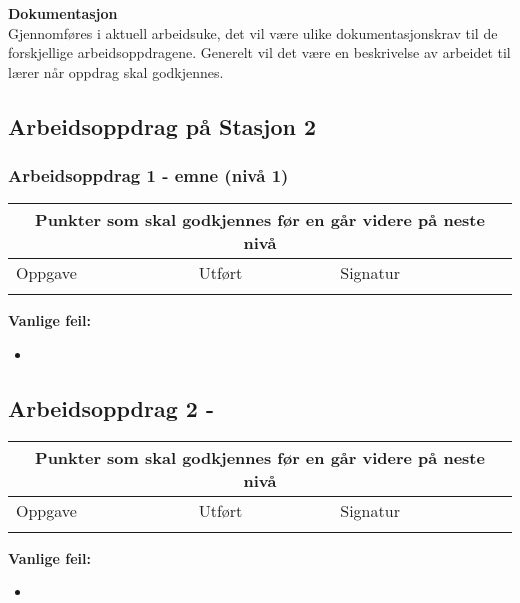 \textbf{Dokumentasjon}\\
Gjennomføres i aktuell arbeidsuke, det vil være ulike dokumentasjonskrav til de forskjellige arbeidsoppdragene. Generelt vil det være en beskrivelse av arbeidet til lærer når oppdrag skal godkjennes. \\


\newpage
\subsection*{Arbeidsoppdrag på Stasjon 2}

\subsubsection*{Arbeidsoppdrag 1 -  emne (nivå 1)}

\begin{center} \begin{tabular}{ | m{8cm} | m{1cm}| m{2cm} | } 
\hline
\multicolumn{3}{|c|}{Punkter som skal godkjennes før en går videre på neste nivå} \\
	\hline
	Oppgave	& Utført & Signatur \\ 
	\hline
& & \\ 
	\hline
\end{tabular}
\end{center}

\textbf{Vanlige feil:}
\begin{itemize}[noitemsep]
	\item 
\end{itemize}
\newpage
\subsection*{Arbeidsoppdrag 2 -} 

\begin{center}
\begin{tabular}{ | m{8cm} | m{1cm}| m{2cm} | } 
\hline
\multicolumn{3}{|c|}{Punkter som skal godkjennes før en går videre på neste nivå} \\
	\hline
	Oppgave	& Utført & Signatur \\ 
	\hline
& & \\ 
	\hline
\end{tabular}
\end{center}
\textbf{Vanlige feil:}
\begin{itemize}[noitemsep]
	\item 
\end{itemize}
\newpage
